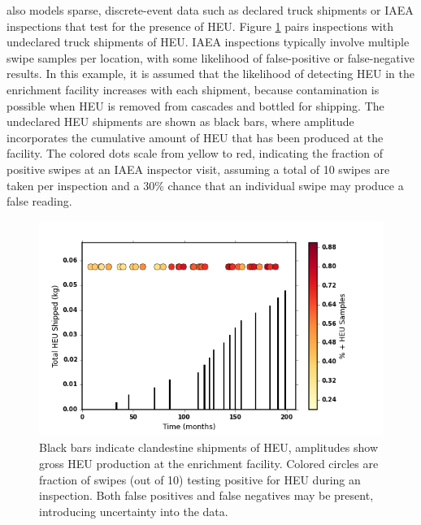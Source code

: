 \Cyclus also models sparse, discrete-event data such as declared truck shipments or IAEA inspections that test for the presence of \gls{HEU}. Figure \ref{fig:inspect} pairs inspections with undeclared truck shipments of \gls{HEU}.  IAEA inspections typically involve multiple swipe samples per location, with some likelihood of false-positive or false-negative results\cite{ryjinski_idms_2003}. In this example, it is assumed that the likelihood of detecting \gls{HEU} in the enrichment facility increases with each shipment, because contamination is possible when \gls{HEU} is removed from cascades and bottled for shipping.  The undeclared \gls{HEU} shipments are shown as black bars, where amplitude incorporates the cumulative amount of \gls{HEU} that has been produced at the facility. The colored dots scale from yellow to red, indicating the fraction of positive swipes at an \gls{IAEA} inspector visit, assuming a total of 10 swipes are taken per inspection and a 30\% chance that an individual swipe may produce a false reading.  

\begin{figure}%
\begin{center}
\includegraphics[natwidth=162bp,natheight=227bp, scale=0.6]{./figs/mm_5enrich_tinytails_inspinspect_ship.png}
\end{center}
\caption{Black bars indicate clandestine shipments of \gls{HEU}, amplitudes show gross \gls{HEU} production at the enrichment facility.  Colored circles are fraction of swipes (out of 10) testing positive for \gls{HEU} during an inspection. Both false positives and false negatives may be present, introducing uncertainty into the data.}
\label{fig:inspect}
\end{figure}

